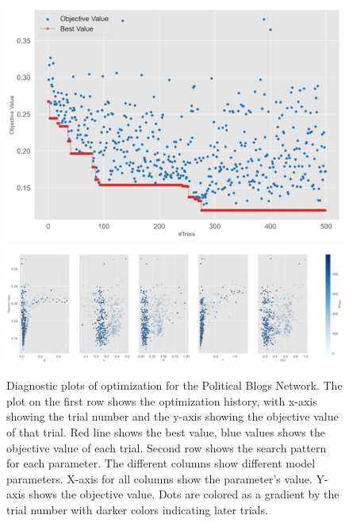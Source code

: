 \documentclass[11pt]{article}
\begin{document}
\begin{figure}[H]
    \centering
    \includegraphics[width=.7\linewidth]{../plots/overall/Optimization_History_polblogs.png}
    \includegraphics[width=.7\linewidth]{../plots/overall/Plot_Slice_polblogs.png}
  \caption{Diagnostic plots of optimization for the Political Blogs Network. The plot on the first row shows the optimization history, with x-axis showing the trial number and the y-axis showing the objective value of that trial. Red line shows the best value, blue values shows the objective value of each trial. Second row shows the search pattern for each parameter. The different columns show different model parameters. X-axis for all columns show the parameter's value. Y-axis shows the objective value. Dots are colored as a gradient by the trial number with darker colors indicating later trials.}
  \label{appendix:optimization_polblogs}
\end{figure}
\end{document}
